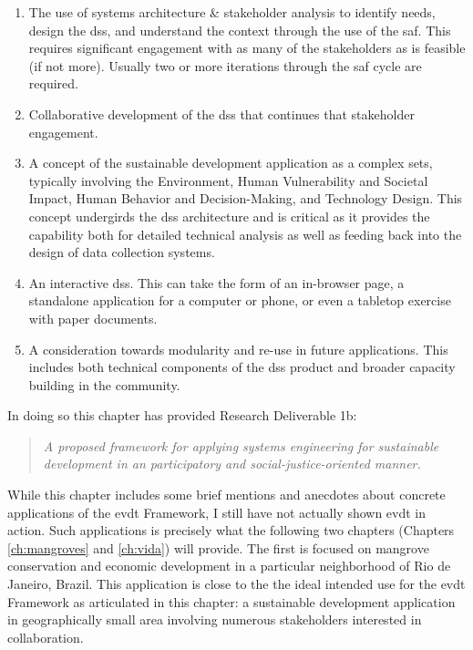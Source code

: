 \begin{enumerate}[label=\emph{\Alph*},itemsep=0pt,parsep=0pt]
	\item{The use of systems architecture \& stakeholder analysis to identify needs, design the \ac{dss}, and understand the context through the use of the \acf{saf}. This requires significant engagement with as many of the stakeholders as is feasible (if not more). Usually two or more iterations through the \ac{saf} cycle are required.}
	\item{Collaborative development of the \ac{dss} that continues that stakeholder engagement.}
	\item{A concept of the sustainable development application as a complex \ac{sets}, typically involving the Environment, Human Vulnerability and Societal Impact, Human Behavior and Decision-Making, and Technology Design. This concept undergirds the \ac{dss} architecture and is critical as it provides the capability both for detailed technical analysis as well as feeding back into the design of data collection systems.}
	\item{An interactive \ac{dss}. This can take the form of an in-browser page, a standalone application for a computer or phone, or even a tabletop exercise with paper documents.}
	\item{A consideration towards modularity and re-use in future applications. This includes both technical components of the \ac{dss} product and broader capacity building in the community.}
\end{enumerate}

In doing so this chapter has provided Research Deliverable 1b:

\blockquote{\textit{A proposed framework for applying systems engineering for sustainable development in an participatory and social-justice-oriented manner.}}

While this chapter includes some brief mentions and anecdotes about concrete applications of the \ac{evdt} Framework, I still have not actually shown \ac{evdt} in action. Such applications is precisely what the following two chapters (Chapters \ref{ch:mangroves} and \ref{ch:vida}) will provide. The first is focused on mangrove conservation and economic development in a particular neighborhood of Rio de Janeiro, Brazil. This application is close to the the ideal intended use for the \ac{evdt} Framework as articulated in this chapter: a sustainable development application in geographically small area involving numerous stakeholders interested in collaboration. 

